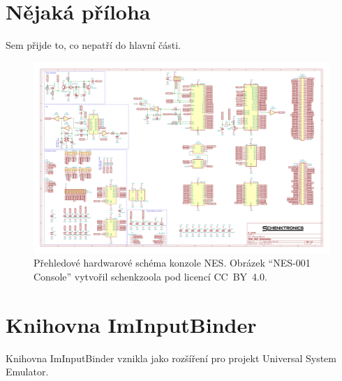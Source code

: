 \chapter{Nějaká příloha}


Sem přijde to, co nepatří do hlavní části.

\begin{figure}[p!]
	\centering
	\caption{Přehledové hardwarové schéma konzole NES. Obrázek \enquote{NES-001 Console} vytvořil schenkzoola pod licencí CC~BY~4.0.}
	\label{fig:nes001-hw}
	\includegraphics[width=0.95\textheight, angle=270]{images/NES-001.pdf}
\end{figure}

\chapter{Knihovna ImInputBinder}
\label{apx:binder}

Knihovna ImInputBinder vznikla jako rozšíření pro projekt Universal System Emulator.